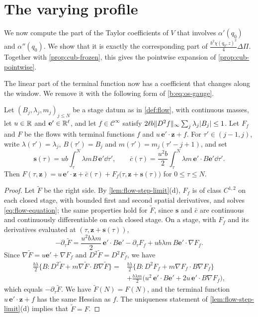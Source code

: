 \section{The varying profile}\label{sec:cub-profile}

We now compute the part of the Taylor coefficients of $V$ that involves
$\alpha'(q_0)$ and $\alpha''(q_0)$. We show that it is exactly the
corresponding part of $\frac{b^2\chi(q_0,z)^2}4\Delta\Pi$. Together with
\cref{prop:cub-frozen}, this gives the pointwise expansion of
\cref{prop:cub-pointwise}.

The linear part of the terminal function now has a coefficient that changes
along the window. We remove it with the following form of
\eqref{b:eq:os-gauge}.

\begin{lemma}\label{lem:cub-shift}
Let $(B_j,\lambda_j,m_j)_{j\le N}$ be a stage datum as in \cref{def:flow}, with
continuous masses, let $u\in\mathbb R$ and $\mathbf e'\in\mathbb R^\ell$, and let
$f\in\mathcal C^\infty$ satisfy $2\ell b\lVert D^2f\rVert_\infty\sum_j\lambda_j\lvert B_j\rvert\le1$.
Let $F_f$ and $F$ be the flows with terminal functions $f$ and
$u\,\mathbf e'\cdot\mathbf z+f$. For $\tau'\in(j-1,j)$, write
$\lambda(\tau')=\lambda_j$, $B(\tau')=B_j$ and $m(\tau')=m_j(\tau'-j+1)$, and set
\[
 \mathbf s(\tau)=ub\int_\tau^N\lambda m B\,\mathbf e'\dd\tau',\qquad
 \bar c(\tau)=\frac{u^2b}2\int_\tau^N\lambda m\,\mathbf e'\cdot B\mathbf e'\dd\tau'.
\]
Then $F(\tau,\mathbf z)=u\,\mathbf e'\cdot\mathbf z+\bar c(\tau)
+F_f\bigl(\tau,\mathbf z+\mathbf s(\tau)\bigr)$ for $0\le\tau\le N$.
\end{lemma}

\begin{proof}
Let $\widetilde F$ be the right side. By \cref{lem:flow-step-limit}(d),
$F_f$ is of class $C^{1,2}$ on each closed stage, with bounded first and
second spatial derivatives, and solves \eqref{eq:flow-equation}; the same
properties hold for $\widetilde F$, since $\mathbf s$ and $\bar c$ are continuous
and continuously differentiable on each closed stage. On a stage, with
$F_f$ and its derivatives evaluated at $(\tau,\mathbf z+\mathbf s(\tau))$,
\[
 -\partial_\tau\widetilde F=\frac{u^2b\lambda m}2\,\mathbf e'\cdot B\mathbf e'
 -\partial_\tau F_f+ub\lambda m\,B\mathbf e'\cdot\nabla F_f .
\]
Since $\nabla\widetilde F=u\mathbf e'+\nabla F_f$ and
$D^2\widetilde F=D^2F_f$, we have
\[
\begin{aligned}
 \frac{b\lambda}2\bigl\{B\mathbin:D^2\widetilde F+m\nabla\widetilde F\cdot B\nabla\widetilde F\bigr\}
 ={}&\frac{b\lambda}2\bigl\{B\mathbin:D^2F_f+m\nabla F_f\cdot B\nabla F_f\bigr\}\\
 &+\frac{b\lambda m}2\bigl(u^2\,\mathbf e'\cdot B\mathbf e'+2u\,\mathbf e'\cdot B\nabla F_f\bigr),
\end{aligned}
\]
which equals $-\partial_\tau\widetilde F$. We have $\widetilde F(N)=F(N)$, and the
terminal function $u\,\mathbf e'\cdot\mathbf z+f$ has the same Hessian as $f$.
The uniqueness statement of \cref{lem:flow-step-limit}(d) implies that
$\widetilde F=F$.
\end{proof}

